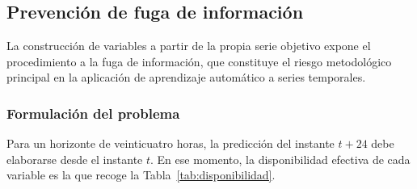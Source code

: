 



\subsection{Prevención de fuga de información}
\label{sec:fuga}

La construcción de variables a partir de la propia serie objetivo expone el
procedimiento a la fuga de información, que constituye el riesgo metodológico
principal en la aplicación de aprendizaje automático a series temporales.

\subsubsection*{Formulación del problema}

Para un horizonte de veinticuatro horas, la predicción del instante $t+24$ debe
elaborarse desde el instante $t$. En ese momento, la disponibilidad efectiva de
cada variable es la que recoge la Tabla~\ref{tab:disponibilidad}.

